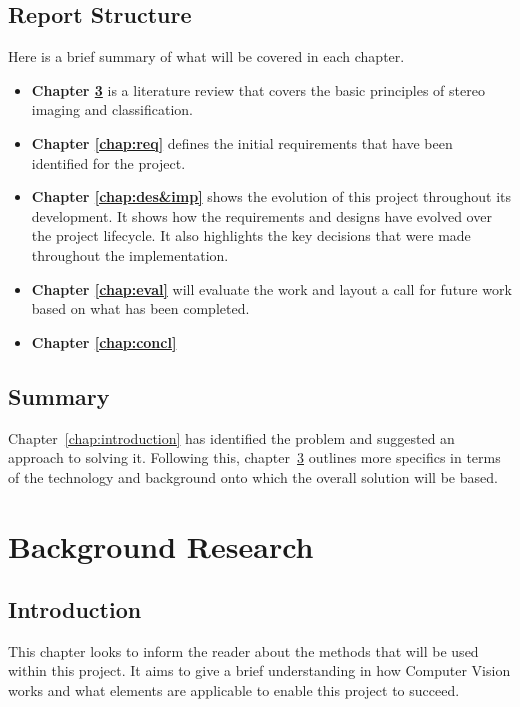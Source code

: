 \documentclass[11pt,oneside]{report}
\begin{document}
		\section{Report Structure}
			Here is a brief summary of what will be covered in each chapter.
			\begin{itemize}
			 \item \textbf{Chapter \ref{chap:background}}
			 	is a literature review that covers the basic principles of stereo imaging and classification.
			 \item \textbf{Chapter \ref{chap:req}}
			 	defines the initial requirements that have been identified for the project.
			 \item \textbf{Chapter \ref{chap:des&imp}}
			 	shows the evolution of this project throughout its development.
			 	It shows how the requirements and designs have evolved over the project lifecycle.
			 	It also highlights the key decisions that were made throughout the implementation.
			 	
			 \item \textbf{Chapter \ref{chap:eval}}
			 	will evaluate the work and layout a call for future work based on what has been completed.
			 \item \textbf{Chapter \ref{chap:concl}}
			\end{itemize}
						
		\section{Summary}
		Chapter~\ref{chap:introduction} has identified the problem and suggested an approach to solving it.
		Following this, chapter~\ref{chap:background} outlines more specifics in terms of the technology and background onto which the overall solution will be based.
		
	\chapter{Background Research}\label{chap:background}
			\section{Introduction}
			This chapter looks to inform the reader about the methods that will be used within this project.
			It aims to give a brief understanding in how Computer Vision works and what elements are applicable to enable this project to succeed.
\end{document}
